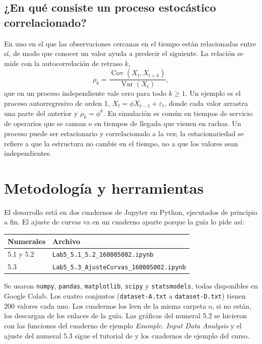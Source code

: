 \documentclass[11pt,letterpaper]{article}
\newcommand{\codigoEstudiante}{160005002}
\begin{document}
\subsection{¿En qué consiste un proceso estocástico correlacionado?}

En uno en el que las observaciones cercanas en el tiempo están relacionadas entre sí, de modo que conocer un valor
ayuda a predecir el siguiente. La relación se mide con la autocorrelación de retraso $k$,
\[
\rho_k = \frac{\operatorname{Cov}(X_t, X_{t+k})}{\operatorname{Var}(X_t)},
\]
que en un proceso independiente vale cero para todo $k \ge 1$. Un ejemplo es el proceso autorregresivo de orden 1,
$X_t = \phi X_{t-1} + \varepsilon_t$, donde cada valor arrastra una parte del anterior y $\rho_k = \phi^k$. En
simulación es común en tiempos de servicio de operarios que se cansan o en tiempos de llegada que vienen en
rachas. Un proceso puede ser estacionario y correlacionado a la vez; la estacionariedad se refiere a que la
estructura no cambie en el tiempo, no a que los valores sean independientes.

\section{Metodología y herramientas}

El desarrollo está en dos cuadernos de Jupyter en Python, ejecutados de principio a fin. El ajuste de curvas va
en un cuaderno aparte porque la guía lo pide así:

\begin{center}
\begin{tabular}{@{}ll@{}}
\toprule
Numerales & Archivo \\
\midrule
5.1 y 5.2 & \texttt{Lab5\_5.1\_5.2\_\codigoEstudiante.ipynb} \\
5.3 & \texttt{Lab5\_5.3\_AjusteCurvas\_\codigoEstudiante.ipynb} \\
\bottomrule
\end{tabular}
\end{center}

Se usaron \texttt{numpy}, \texttt{pandas}, \texttt{matplotlib}, \texttt{scipy} y \texttt{statsmodels}, todas
disponibles en Google Colab. Los cuatro conjuntos (\texttt{dataset-A.txt} a \texttt{dataset-D.txt}) tienen 200
valores cada uno. Los cuadernos los leen de la misma carpeta o, si no están, los descargan de los enlaces de la
guía. Las gráficas del numeral 5.2 se hicieron con las funciones del cuaderno de ejemplo \emph{Example. Input Data
Analysis} y el ajuste del numeral 5.3 sigue el tutorial de \cite{amat2021} y los cuadernos de ejemplo del curso.
\end{document}
